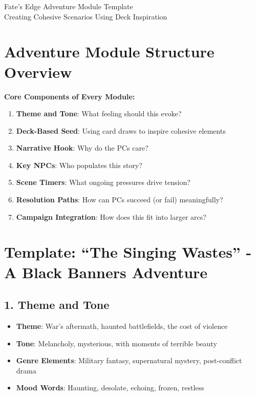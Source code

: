 \documentclass[11pt]{article}
\begin{document}
\begin{center}
{\LARGE Fate's Edge Adventure Module Template}\\
\vspace{0.5em}
{\large Creating Cohesive Scenarios Using Deck Inspiration}
\end{center}

\section*{Adventure Module Structure Overview}

\begin{mdframed}[backgroundcolor=modulebg]
\textbf{Core Components of Every Module:}
\begin{enumerate}[leftmargin=*]
\item \textbf{Theme and Tone}: What feeling should this evoke?
\item \textbf{Deck-Based Seed}: Using card draws to inspire cohesive elements
\item \textbf{Narrative Hook}: Why do the PCs care?
\item \textbf{Key NPCs}: Who populates this story?
\item \textbf{Scene Timers}: What ongoing pressures drive tension?
\item \textbf{Resolution Paths}: How can PCs succeed (or fail) meaningfully?
\item \textbf{Campaign Integration}: How does this fit into larger arcs?
\end{enumerate}
\end{mdframed}

\section*{Template: ``The Singing Wastes'' - A Black Banners Adventure}

\subsection*{1. Theme and Tone}

\begin{itemize}[leftmargin=*]
\item \textbf{Theme}: War's aftermath, haunted battlefields, the cost of violence
\item \textbf{Tone}: Melancholy, mysterious, with moments of terrible beauty
\item \textbf{Genre Elements}: Military fantasy, supernatural mystery, post-conflict drama
\item \textbf{Mood Words}: Haunting, desolate, echoing, frozen, restless
\end{itemize}
\end{document}
